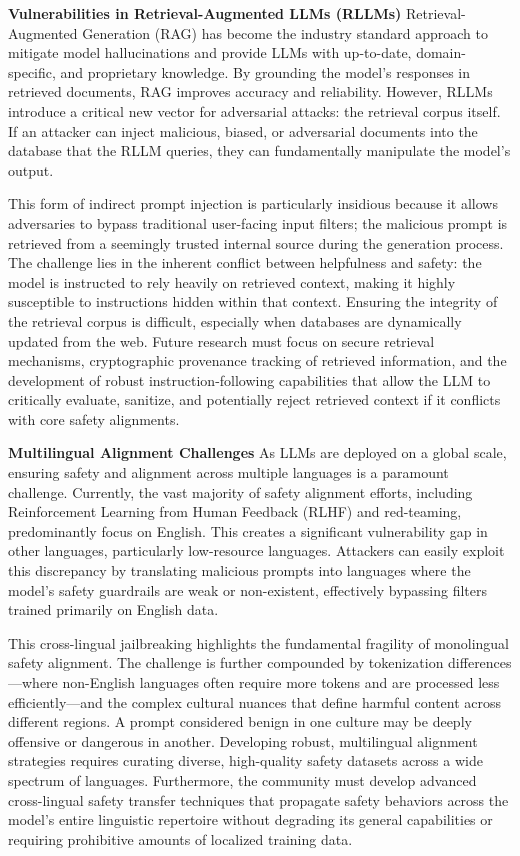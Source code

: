 \documentclass[11pt,a4paper]{article}
\begin{document}
\textbf{Vulnerabilities in Retrieval-Augmented LLMs (RLLMs)}
Retrieval-Augmented Generation (RAG) has become the industry standard approach to mitigate model hallucinations and provide LLMs with up-to-date, domain-specific, and proprietary knowledge. By grounding the model's responses in retrieved documents, RAG improves accuracy and reliability. However, RLLMs introduce a critical new vector for adversarial attacks: the retrieval corpus itself. If an attacker can inject malicious, biased, or adversarial documents into the database that the RLLM queries, they can fundamentally manipulate the model's output. 

This form of indirect prompt injection is particularly insidious because it allows adversaries to bypass traditional user-facing input filters; the malicious prompt is retrieved from a seemingly trusted internal source during the generation process. The challenge lies in the inherent conflict between helpfulness and safety: the model is instructed to rely heavily on retrieved context, making it highly susceptible to instructions hidden within that context. Ensuring the integrity of the retrieval corpus is difficult, especially when databases are dynamically updated from the web. Future research must focus on secure retrieval mechanisms, cryptographic provenance tracking of retrieved information, and the development of robust instruction-following capabilities that allow the LLM to critically evaluate, sanitize, and potentially reject retrieved context if it conflicts with core safety alignments.

\textbf{Multilingual Alignment Challenges}
As LLMs are deployed on a global scale, ensuring safety and alignment across multiple languages is a paramount challenge. Currently, the vast majority of safety alignment efforts, including Reinforcement Learning from Human Feedback (RLHF) and red-teaming, predominantly focus on English. This creates a significant vulnerability gap in other languages, particularly low-resource languages. Attackers can easily exploit this discrepancy by translating malicious prompts into languages where the model's safety guardrails are weak or non-existent, effectively bypassing filters trained primarily on English data. 

This cross-lingual jailbreaking highlights the fundamental fragility of monolingual safety alignment. The challenge is further compounded by tokenization differences---where non-English languages often require more tokens and are processed less efficiently---and the complex cultural nuances that define harmful content across different regions. A prompt considered benign in one culture may be deeply offensive or dangerous in another. Developing robust, multilingual alignment strategies requires curating diverse, high-quality safety datasets across a wide spectrum of languages. Furthermore, the community must develop advanced cross-lingual safety transfer techniques that propagate safety behaviors across the model's entire linguistic repertoire without degrading its general capabilities or requiring prohibitive amounts of localized training data.
\end{document}
